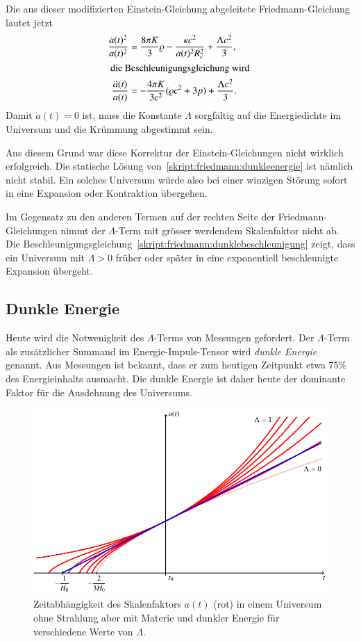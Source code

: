 Die aus dieser modifizierten Einstein-Gleichung abgeleitete
Friedmann-Gleichung lautet jetzt
\begin{align}
\frac{\dot a(t)^2}{a(t)^2}
&=
\frac{8\pi K}{3}\varrho - \frac{\kappa c^2}{a(t)^2R_c^2} + \frac{\Lambda c^2}{3},
\label{skript:friedmann:dunkleenergie}
\\
\intertext{
die Beschleunigungsgleichung wird
}
\frac{\ddot a(t)}{a(t)}
&=
-\frac{4\pi K}{3c^2}(\varrho c^2+3p) + \frac{\Lambda c^2}{3}.
\label{skript:friedmann:dunklebeschleunigung}
\end{align}
Damit $\dot a(t)=0$ ist, muss die Konstante $\Lambda$ sorgfältig auf
die Energiedichte im Universum und die Krümmung abgestimmt sein.

Aus diesem Grund war diese Korrektur der Einstein-Gleichungen nicht
wirklich erfolgreich.
Die statische Lösung von~\eqref{skript:friedmann:dunkleenergie}
ist nämlich nicht stabil.
Ein solches Universum würde also bei einer winzigen Störung sofort
in eine Expansion oder Kontraktion übergehen.

Im Gegensatz zu den anderen Termen auf der rechten Seite der
Friedmann-Gleichungen nimmt der $\Lambda$-Term mit grösser werdendem
Skalenfaktor nicht ab.
Die Beschleunigungsgleichung~\eqref{skript:friedmann:dunklebeschleunigung}
zeigt, dass ein Universum mit $\Lambda > 0$ früher oder später
in eine exponentiell beschleunigte Expansion übergeht.

\subsection{Dunkle Energie}
Heute wird die Notwenigkeit des $\Lambda$-Terms von Messungen
gefordert.
Der $\Lambda$-Term als zusätzlicher Summand im Energie-Impuls-Tensor
wird {\em dunkle Energie} genannt.
Aus Messungen ist bekannt, dass er zum heutigen Zeitpunkt etwa 75\%
des Energieinhalts ausmacht.
Die dunkle Energie ist daher heute der dominante Faktor für die
Ausdehnung des Universums.
\begin{figure}
\centering
\includegraphics{chapters/tikz/darkenergy.pdf}
\caption{Zeitabhängigkeit des Skalenfaktors $a(t)$ ({\color{red}rot})
in einem Universum ohne Strahlung aber mit Materie und dunkler Energie
für verschiedene Werte von $\Lambda$.
\label{skript:friedman:graph:darkenergy}}
\end{figure}


